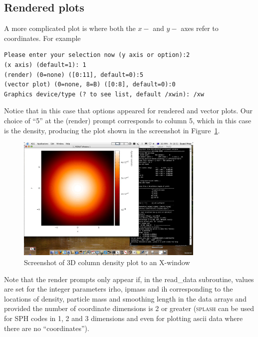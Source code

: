 \documentclass[a4paper,10pt]{article}
\newcommand{\splash}{\textsc{splash }}
\begin{document}
\subsection{Rendered plots}
\label{sec:renderplot}
A more complicated plot is where both the $x-$ and $y-$ axes refer to coordinates. For example
\begin{verbatim}
Please enter your selection now (y axis or option):2
(x axis) (default=1): 1
(render) (0=none) ([0:11], default=0):5
(vector plot) (0=none, 8=B) ([0:8], default=0):0
Graphics device/type (? to see list, default /xwin): /xw
\end{verbatim}
Notice that in this case that options appeared for rendered and vector plots. Our choice of ``5'' at the (render) prompt corresponds to column 5, which in this case is the density, producing the plot shown in the screenshot in Figure~\ref{fig:renderplot}.
\begin{figure}[h]
\begin{center}
\includegraphics[width=0.8\textwidth]{renderplot.jpg}
\caption{Screenshot of 3D column density plot to an X-window}
\label{fig:renderplot}
\end{center}
\end{figure}

 Note that the render prompts only appear if, in the read\_data subroutine, values are set for the integer parameters irho, ipmass and ih corresponding to the locations of density, particle mass and smoothing length in the data arrays and provided the number of coordinate dimensions is 2 or greater (\splash can be used for SPH codes in 1, 2 and 3 dimensions and even for plotting ascii data where there are no ``coordinates'').
\end{document}
